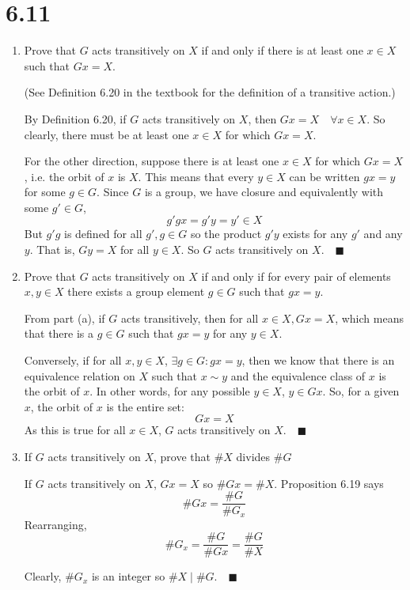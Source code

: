 \documentclass[12pt]{article}
\newcommand{\qed}{\quad \blacksquare}
\begin{document}
\pagebreak

\section*{6.11}
\begin{enumerate}[label=(\alph*)]
    \item Prove that $G$ acts transitively on $X$ if and only if there is at least one $x \in X$ such that $Gx = X$.
    
    (See Definition 6.20 in the textbook for the definition of a transitive action.)
    
        \color{blue}
            By Definition 6.20, if $G$ acts transitively on $X$, then $Gx = X \quad \forall x \in X$. So clearly, there must be at least one $x \in X$ for which $Gx = X$. 

            For the other direction, suppose there is at least one $x \in X$ for which $Gx = X$, i.e. the orbit of $x$ is $X$. This means that every $y \in X$ can be written $gx = y$ for some $g \in G$. Since $G$ is a group, we have closure and equivalently with some $g'\in G$, 
            \[g'gx = g'y = y' \in X\]
            But $g'g$ is defined for all $g', g \in G$ so the product $g'y$ exists for any $g'$ and any $y$. That is, $Gy = X$ for all $y \in X$. So $G$ acts transitively on $X. \qed$
        \color{black}

    \item Prove that $G$ acts transitively on $X$ if and only if for every pair of elements $x, y \in X$ there exists a group element $g\in G$ such that $gx = y$.
    
        \color{blue}
            From part (a), if $G$ acts transitively, then for all $x\in X, Gx = X$, which means that there is a $g\in G$ such that $gx = y$ for any $y \in X$. 

            Conversely, if for all $x, y \in X$, $\exists g\in G: gx =y$, then we know that there is an equivalence relation on $X$ such that $x \sim y$ and the equivalence class of $x$ is the orbit of $x$. In other words, for any possible $y \in X$, $y \in Gx$. So, for a given $x$, the orbit of $x$ is the entire set:
            \[Gx = X\]
            As this is true for all $x\in X$, $G$ acts transitively on $X. \qed$
        \color{black}

    \item If $G$ acts transitively on $X$, prove that $\#X$ divides $\#G$

        \color{blue}
            If $G$ acts transitively on $X$, $Gx = X$ so $\#Gx = \#X$. Proposition 6.19 says 
            \[\#Gx = \frac{\#G}{\#G_x}\]
            Rearranging, 
            \[\#G_x = \frac{\#G}{\#Gx} = \frac{\#G}{\#X}\]
            
            Clearly, $\#G_x$ is an integer so $\#X \; | \; \#G. \qed$
        \color{black}
\end{enumerate}
\end{document}
